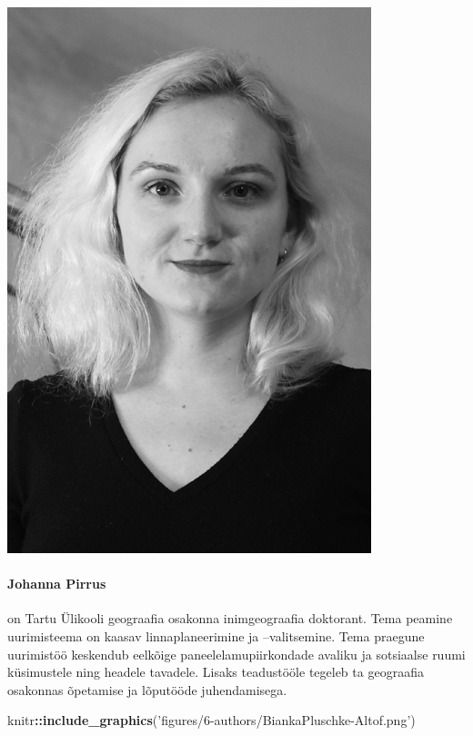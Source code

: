 \documentclass[estonian,]{article}
\newenvironment{Shaded}{\begin{snugshade}}{\end{snugshade}}
\newcommand{\KeywordTok}[1]{\textcolor[rgb]{0.13,0.29,0.53}{\textbf{#1}}}
\newcommand{\NormalTok}[1]{#1}
\newcommand{\OperatorTok}[1]{\textcolor[rgb]{0.81,0.36,0.00}{\textbf{#1}}}
\newcommand{\StringTok}[1]{\textcolor[rgb]{0.31,0.60,0.02}{#1}}
\let\oldparagraph\paragraph
\renewcommand{\paragraph}[1]{\oldparagraph{#1}\mbox{}}
\begin{document}
\begin{flushleft}\includegraphics[width=0.5\linewidth]{figures/6-authors/JohannaPirrus} \end{flushleft}

\hypertarget{johanna-pirrus}{%
\paragraph{Johanna Pirrus}\label{johanna-pirrus}}

on Tartu Ülikooli geograafia osakonna inimgeograafia doktorant. Tema peamine uurimisteema on kaasav linnaplaneerimine ja --valitsemine. Tema praegune uurimistöö keskendub eelkõige paneelelamupiirkondade avaliku ja sotsiaalse ruumi küsimustele ning headele tavadele. Lisaks teadustööle tegeleb ta geograafia osakonnas õpetamise ja lõputööde juhendamisega.

\begin{Shaded}
\begin{Highlighting}[]
\NormalTok{knitr}\OperatorTok{::}\KeywordTok{include_graphics}\NormalTok{(}\StringTok{'figures/6-authors/BiankaPluschke-Altof.png'}\NormalTok{)}
\end{Highlighting}
\end{Shaded}
\end{document}
